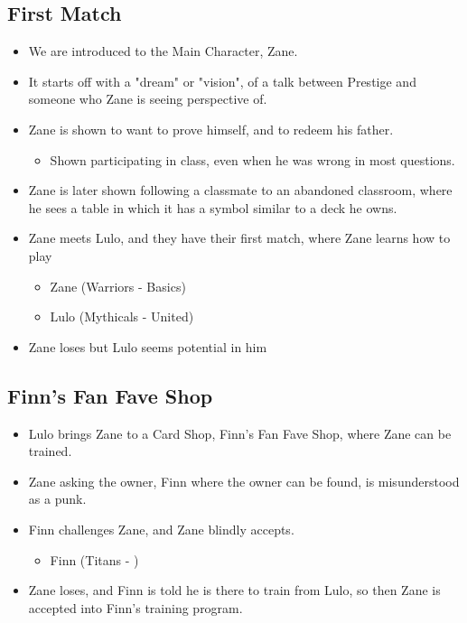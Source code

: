 \subsection{First Match}
\begin{itemize}
    \item We are introduced to the Main Character, Zane.
    \item It starts off with a "dream" or "vision", of a talk between Prestige and 
    someone who Zane is seeing perspective of. 
    \item Zane is shown to want to prove himself, and to redeem his father. 
        \begin{itemize}
            \item Shown participating in class, even when he was wrong in most questions. 
        \end{itemize}
    \item Zane is later shown following a classmate to an abandoned classroom, where 
    he sees a table in which it has a symbol similar to a deck he owns. 
    \item Zane meets Lulo, and they have their first match, where Zane learns how to play
        \begin{itemize}
            \item Zane (Warriors - Basics)
            \item Lulo (Mythicals - United)
        \end{itemize}
    \item Zane loses but Lulo seems potential in him
\end{itemize}
%
\subsection{Finn's Fan Fave Shop}
\begin{itemize}
    \item Lulo brings Zane to a Card Shop, Finn's Fan Fave Shop, where Zane can be trained. 
    \item Zane asking the owner, Finn where the owner can be found, is misunderstood as a punk. 
    \item Finn challenges Zane, and Zane blindly accepts. 
        \begin{itemize}
            \item Finn (Titans - )
        \end{itemize}
    \item Zane loses, and Finn is told he is there to train from Lulo, so then Zane is accepted 
    into Finn's training program. 
\end{itemize}

\subsection{}